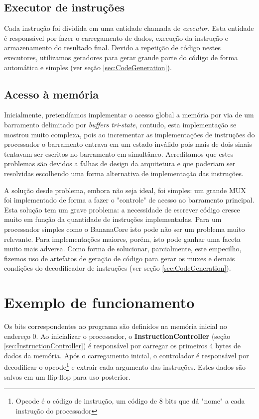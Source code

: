 \documentclass[11pt]{report}
\begin{document}
\subsection{Executor de instruções}
\label{sec:InstructionExecutor}
Cada instrução foi dividida em uma entidade chamada de \emph{executor}. Esta entidade é responsável por fazer o carregamento de dados, execução da instrução e armazenamento do resultado final. Devido a repetição de código nestes executores, utilizamos geradores para gerar grande parte do código de forma automática e simples (ver seção \ref{sec:CodeGeneration}).

\subsection{Acesso à memória}
\label{sec:MemoryAccess}

Inicialmente, pretendíamos implementar o acesso global a memória por via de um barramento delimitado por \emph{buffers tri-state}, contudo, esta implementação se mostrou muito complexa, pois ao incrementar as implementações de instruções do processador o barramento entrava em um estado inválido pois mais de dois sinais tentavam ser escritos no barramento em simultâneo. Acreditamos que estes problemas são devidos a falhas de design da arquitetura e que poderiam ser resolvidas escolhendo uma forma alternativa de implementação das instruções.

A solução desde problema, embora não seja ideal, foi simples: um grande MUX foi implementado de forma a fazer o "controle" de acesso ao barramento principal. Esta solução tem um grave problema: a necessidade de escrever código cresce muito em função da quantidade de instruções implementadas. Para um processador simples como o BananaCore isto pode não ser um problema muito relevante. Para implementações maiores, porém, isto pode ganhar uma faceta muito mais adversa. Como forma de solucionar, parcialmente, este empecilho, fizemos uso de artefatos de geração de código para gerar os muxes e demais condições do decodificador de instruções (ver seção \ref{sec:CodeGeneration}).


\section{Exemplo de funcionamento}

Os bits correspondentes ao programa são definidos na memória inicial no endereço $0$. Ao inicializar o processador, o \textbf{InstructionController} (seção \ref{sec:InstructionController}) é responsável por carregar os primeiros 4 bytes de dados da memória. Após o carregamento inicial, o controlador é responsável por decodificar o opcode\footnote{Opcode é o código de instrução, um código de 8 bits que dá "nome" a cada instrução do processador} e extrair cada argumento das instruções. Estes dados são salvos em um flip-flop para uso posterior.
\end{document}
